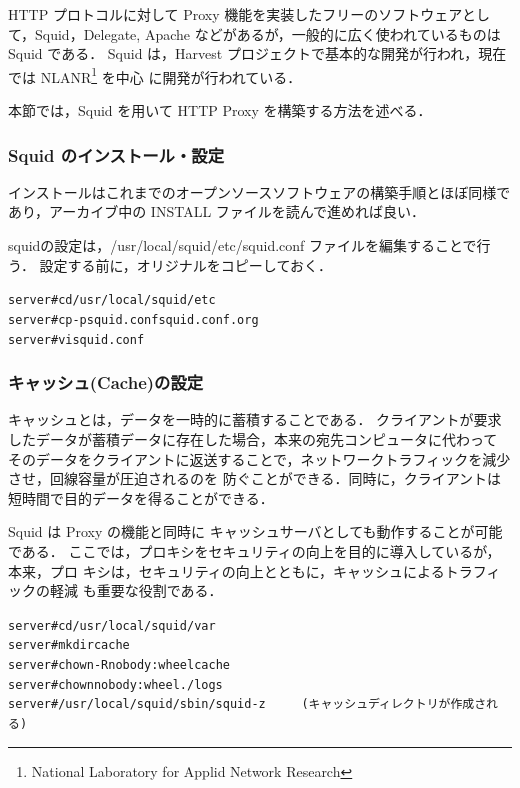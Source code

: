 HTTP プロトコルに対して Proxy 機能を実装したフリーのソフトウェアとし
て，Squid，Delegate, Apache などがあるが，一般的に広く使われているものは Squid である．
Squid は，Harvest プロジェクトで基本的な開発が行われ，現在では
NLANR\footnote{National Laboratory for Applid Network Research} を中心
に開発が行われている．

本節では，Squid を用いて HTTP Proxy を構築する方法を述べる．

\subsubsection{Squid のインストール・設定}

インストールはこれまでのオープンソースソフトウェアの構築手順とほぼ同様で
あり，アーカイブ中の INSTALL ファイルを読んで進めれば良い．

squidの設定は，/usr/local/squid/etc/squid.conf ファイルを編集することで行う．
設定する前に，オリジナルをコピーしておく．

\begin{center}
\begin{breakbox}
\begin{alltt}
server# cd /usr/local/squid/etc
server# cp -p squid.conf squid.conf.org
server# vi squid.conf
\end{alltt}
\end{breakbox}
\end{center}

\subsubsection{キャッシュ(Cache)の設定}
%
キャッシュとは，データを一時的に蓄積することである．
クライアントが要求したデータが蓄積データに存在した場合，本来の宛先コンピュータに代わって
そのデータをクライアントに返送することで，ネットワークトラフィックを減少させ，回線容量が圧迫されるのを
防ぐことができる．同時に，クライアントは短時間で目的データを得ることができる．

Squid は Proxy の機能と同時に キャッシュサーバとしても動作することが可能である．
ここでは，プロキシをセキュリティの向上を目的に導入しているが，本来，プロ
キシは，セキュリティの向上とともに，キャッシュによるトラフィックの軽減
も重要な役割である．

\begin{center}
\begin{breakbox}
\begin{alltt}
server# cd /usr/local/squid/var
server# mkdir cache
server# chown -R nobody:wheel cache
server# chown nobody:wheel ./logs
server# /usr/local/squid/sbin/squid -z　　　(キャッシュディレクトリが作成される)
\end{alltt}
\end{breakbox}
\end{center}

